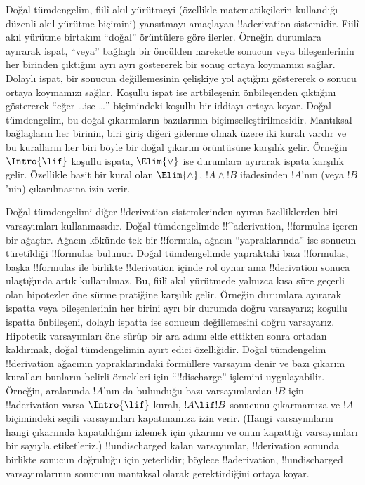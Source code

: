 

      {}
      {}


Doğal tümdengelim, fiilî akıl yürütmeyi (özellikle matematikçilerin kullandığı
düzenli akıl yürütme biçimini) yansıtmayı amaçlayan !!a{derivation}
sistemidir. Fiilî akıl yürütme birtakım “doğal” örüntülere göre ilerler.
Örneğin durumlara ayırarak ispat, “veya” bağlaçlı bir öncülden hareketle
sonucun veya bileşenlerinin her birinden çıktığını ayrı ayrı göstererek bir
sonuç ortaya koymamızı sağlar. Dolaylı ispat, bir sonucun değillemesinin çelişkiye yol açtığını
göstererek o sonucu ortaya koymamızı sağlar. Koşullu ispat ise artbileşenin
önbileşenden çıktığını göstererek “eğer \dots ise \dots” biçimindeki koşullu
bir iddiayı ortaya koyar. Doğal tümdengelim, bu doğal çıkarımların bazılarının
biçimselleştirilmesidir. Mantıksal bağlaçların
 her birinin,
biri giriş diğeri giderme olmak üzere iki kuralı vardır ve bu kuralların her
biri böyle bir doğal çıkarım örüntüsüne karşılık gelir. Örneğin
$\Intro{\lif}$ koşullu ispata, $\Elim{\lor}$ ise durumlara ayırarak ispata
karşılık gelir. Özellikle basit bir kural olan $\Elim{\land}$, $!A \land !B$
ifadesinden $!A$'nın (veya $!B$'nin) çıkarılmasına izin verir.

Doğal tümdengelimi diğer !!{derivation} sistemlerinden ayıran özelliklerden
biri varsayımları kullanmasıdır. Doğal tümdengelimde !!^a{derivation},
!!{formula}s içeren bir ağaçtır. Ağacın kökünde tek bir !!{formula}, ağacın
“yapraklarında” ise sonucun türetildiği !!{formula}s bulunur. Doğal
tümdengelimde yapraktaki bazı !!{formula}s, başka !!{formula}s ile birlikte
!!{derivation} içinde rol oynar ama !!{derivation} sonuca ulaştığında artık
kullanılmaz. Bu, fiilî akıl
yürütmede yalnızca kısa süre geçerli olan hipotezler öne sürme pratiğine
karşılık gelir. Örneğin durumlara ayırarak ispatta veya bileşenlerinin her
birini ayrı bir durumda doğru varsayarız; koşullu ispatta önbileşeni, dolaylı
ispatta ise sonucun değillemesini doğru varsayarız. Hipotetik varsayımları öne
sürüp bir ara adımı elde ettikten sonra ortadan kaldırmak, doğal tümdengelimin
ayırt edici özelliğidir. Doğal tümdengelim !!{derivation} ağacının
yapraklarındaki formüllere varsayım denir ve bazı çıkarım kuralları bunların
belirli örnekleri için “!!{discharge}” işlemini uygulayabilir. Örneğin, aralarında $!A$'nın da
bulunduğu bazı varsayımlardan $!B$ için !!a{derivation} varsa
$\Intro{\lif}$ kuralı,
$!A \lif !B$ sonucunu çıkarmamıza ve $!A$ biçimindeki seçili varsayımları
kapatmamıza izin verir. (Hangi varsayımların hangi çıkarımda kapatıldığını
izlemek için çıkarımı ve onun kapattığı varsayımları bir sayıyla etiketleriz.)
!!{undischarged} kalan varsayımlar, !!{derivation} sonunda birlikte sonucun
doğruluğu için yeterlidir; böylece !!a{derivation}, !!{undischarged}
varsayımlarının sonucunu mantıksal olarak gerektirdiğini ortaya koyar.

